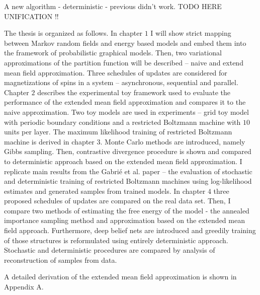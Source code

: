 A new algorithm - deterministic - previous didn't work.\cite{gabrie2015training} TODO HERE UNIFICATION !!

The thesis is organized as follows. In chapter $1$ I will show strict mapping between Markov random fields and energy based models and embed them into the framework of probabilistic graphical models. Then, two variational approximations of the partition function will be described -- naive and extend mean field approximation. Three schedules of updates are considered for magnetizations of spins in a system -- asynchronous, sequential and parallel. Chapter $2$ describes the experimental toy framework used to evaluate the performance of the extended mean field approximation and compares it to the naive approximation. Two toy models are used in experiments -- grid toy model with periodic boundary conditions and a restricted Boltzmann machine with $10$ units per layer. 
The maximum likelihood training of restricted Boltzmann machine is derived in chapter $3$. Monte Carlo methods are introduced, namely Gibbs sampling. Then, contrastive divergence procedure is shown and compared to deterministic approach based on the extended mean field approximation. I replicate main results from the Gabri\'e et al. paper -- the evaluation of stochastic and deterministic training of restricted Boltzmann machines using log-likelihood estimates and generated samples from trained models.
In chapter $4$ three proposed schedules of updates are compared on the real data set. Then, I compare two methods of estimating the free energy of the model - the annealed importance sampling method and approximation based on the extended mean field approach.
Furthermore, deep belief nets are introduced and greedily training of those structures is reformulated using entirely deterministic approach. Stochastic and deterministic procedures are compared by analysis of reconstruction of samples from data.

A detailed derivation of the extended mean field approximation is shown in Appendix A.
